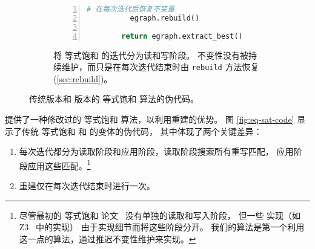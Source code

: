 \begin{figure}
\begin{subfigure}[t]{0.47\linewidth}
\begin{lstlisting}[language=Python, gobble=6, basicstyle=\scriptsize\ttfamily, numbers=left]
          # 在每次迭代后恢复不变量
          egraph.rebuild()

        return egraph.extract_best()
    \end{lstlisting}
    \caption{
      \egg 将 等式饱和 的迭代分为读和写阶段。
      \egraph 不变性没有被持续维护，而只是在每次迭代结束时由 \texttt{rebuild} 方法恢复
      (\autoref{sec:rebuild})。
    }
    \label{fig:eq-sat-code2}
  \end{subfigure}

  \caption{
    传统版本和 \egg 版本的 等式饱和 算法的伪代码。
  }
  \label{fig:eq-sat-code}
\end{figure}

\egg 提供了一种修改过的 等式饱和 算法，以利用重建的优势。
图 \autoref{fig:eq-sat-code} 显示了传统 等式饱和 和 \egg 的变体的伪代码，
  其中体现了两个关键差异：

\begin{enumerate}
  \item 每次迭代都分为读取阶段和应用阶段，读取阶段搜索所有重写匹配，
      应用阶段应用这些匹配。\footnote{
      尽管最初的 等式饱和 论文~\cite{eqsat}
      没有单独的读取和写入阶段，
      但一些 \egraph 实现（如 Z3~\cite{z3} 中的实现）
      由于实现细节而将这些阶段分开。
      我们的算法是第一个利用这一点的算法，通过推迟不变性维护来实现。
    }
  \item 重建仅在每次迭代结束时进行一次。
\end{enumerate}

